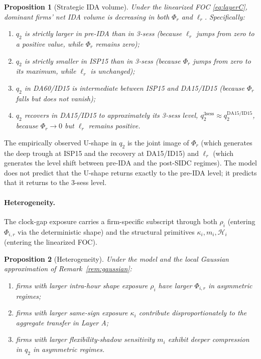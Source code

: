 \documentclass[11pt]{article}
\newtheorem{proposition}{Proposition}
\begin{document}
\begin{proposition}[Strategic IDA volume]
\label{prop:q2}
Under the linearized FOC \eqref{eq:layerC}, dominant firms' net IDA volume is decreasing in both $\Phi_{r}$ and $\ell_{r}$. Specifically:
\begin{enumerate}[label=(\roman*)]
\item $q_{2}$ is strictly larger in pre-IDA than in 3-sess (because $\ell_{r}$ jumps from zero to a positive value, while $\Phi_{r}$ remains zero);
\item $q_{2}$ is strictly smaller in ISP15 than in 3-sess (because $\Phi_{r}$ jumps from zero to its maximum, while $\ell_{r}$ is unchanged);
\item $q_{2}$ in DA60/ID15 is intermediate between ISP15 and DA15/ID15 (because $\Phi_{r}$ falls but does not vanish);
\item $q_{2}$ recovers in DA15/ID15 to approximately its 3-sess level, $q_{2}^{\text{3sess}} \approx q_{2}^{\text{DA15/ID15}}$, because $\Phi_{r} \to 0$ but $\ell_{r}$ remains positive.
\end{enumerate}
\end{proposition}

The empirically observed U-shape in $q_{2}$ is the joint image of $\Phi_{r}$ (which generates the deep trough at ISP15 and the recovery at DA15/ID15) and $\ell_{r}$ (which generates the level shift between pre-IDA and the post-SIDC regimes). The model does not predict that the U-shape returns exactly to the pre-IDA level; it predicts that it returns to the 3-sess level.

\paragraph{Heterogeneity.}
The clock-gap exposure carries a firm-specific subscript through both $\rho_{i}$ (entering $\Phi_{i,r}$ via the deterministic shape) and the structural primitives $\kappa_{i}, m_{i}, \mathcal{H}_{i}$ (entering the linearized FOC).

\begin{proposition}[Heterogeneity]
\label{prop:heterogeneity}
Under the model and the local Gaussian approximation of Remark~\ref{rem:gaussian}:
\begin{enumerate}[label=(\roman*)]
\item firms with larger intra-hour shape exposure $\rho_{i}$ have larger $\Phi_{i,r}$ in asymmetric regimes;
\item firms with larger same-sign exposure $\kappa_{i}$ contribute disproportionately to the aggregate transfer in Layer A;
\item firms with larger flexibility-shadow sensitivity $m_{i}$ exhibit deeper compression in $q_{2}$ in asymmetric regimes.
\end{enumerate}
\end{proposition}
\end{document}
